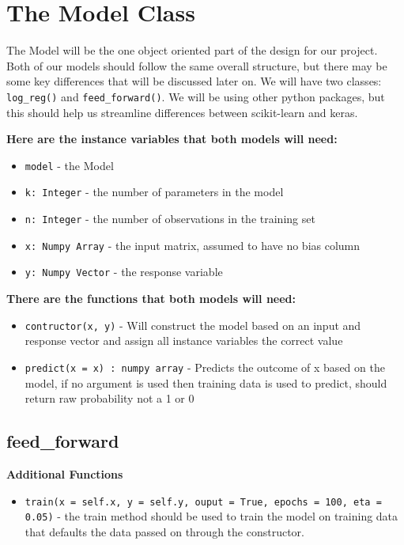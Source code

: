 \documentclass{article}
\begin{document}
	\section{The Model Class} 
	
	The Model will be the one object oriented part of the design for our project. Both of our models should follow the 
	same overall structure, but there may be some key differences that will be discussed later on. We will have two 
	classes: \verb|log_reg()| and \verb|feed_forward()|. We will be using other python packages, but this should help 
	us streamline differences between scikit-learn and keras. 
	
	\textbf{Here are the instance variables that both models will need:}
	
	\begin{itemize}
		\item \verb|model| - the Model 
		\item \verb|k: Integer| - the number of parameters in the model 
		\item \verb|n: Integer| - the number of observations in the training set
		\item \verb|x: Numpy Array| - the input matrix, assumed to have no bias column
		\item \verb|y: Numpy Vector| - the response variable 
	\end{itemize}


	\textbf{There are the functions that both models will need:} 
	
	\begin{itemize}
		\item \verb|contructor(x, y)| - Will construct the model based on an input and response vector and assign 
		all instance variables the correct value 
		\item \verb|predict(x = x) : numpy array| - Predicts the outcome of x based on the model, if no argument is used
		then training data is used to predict, should return raw probability not a 1 or 0
	\end{itemize}

	\subsection{feed\_forward}

	\textbf{Additional Functions}
	\begin{itemize}
		\item \verb|train(x = self.x, y = self.y, ouput = True, epochs = 100, eta = 0.05)| - the train method should be 
		used to train the model on training data that defaults the data passed on through the constructor. 
	\end{itemize}
	
\end{document}
